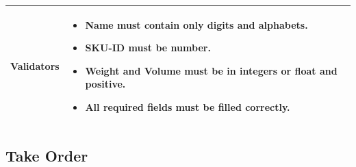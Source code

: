 \documentclass[12pt,a4paper]{article}
\begin{document}
\begin{longtable}{| p{3cm}|p{12cm}|}
Validators & 
\begin{itemize}
\item Name must contain only digits and alphabets.
\item SKU-ID must be number.
\item Weight and Volume must be in integers or float and positive.\item All required fields must be filled correctly. 
\end{itemize}
\\ \hline

\end{longtable} 
\subsection{Take Order}
\end{document}
